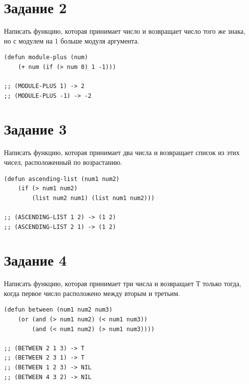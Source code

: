 \documentclass[a4paper,14pt, unknownkeysallowed]{extreport}
\begin{document}
\section{Задание 2}

Написать функцию, которая принимает число и возвращает число того же знака, но с модулем на 1 больше модуля аргумента.

\begin{center}
\captionsetup{justification=raggedright,singlelinecheck=off}
\begin{lstlisting}[label=lst:parallel_processing,caption=Решение задания 2]
(defun module-plus (num)
    (+ num (if (> num 0) 1 -1)))

;; (MODULE-PLUS 1) -> 2
;; (MODULE-PLUS -1) -> -2
\end{lstlisting}
\end{center}

\section{Задание 3}

Написать функцию, которая принимает два числа и возвращает список из этих чисел, расположенный по возрастанию.

\begin{center}
\captionsetup{justification=raggedright,singlelinecheck=off}
\begin{lstlisting}[label=lst:parallel_processing,caption=Решение задания 3]
(defun ascending-list (num1 num2)
    (if (> num1 num2) 
		(list num2 num1) (list num1 num2)))

;; (ASCENDING-LIST 1 2) -> (1 2)
;; (ASCENDING-LIST 2 1) -> (1 2)
\end{lstlisting}
\end{center}

\section{Задание 4}

Написать функцию, которая принимает три числа и возвращает Т только тогда, когда первое число расположено между вторым и третьим.

\begin{center}
\captionsetup{justification=raggedright,singlelinecheck=off}
\begin{lstlisting}[label=lst:parallel_processing,caption=Решение задания 4]
(defun between (num1 num2 num3)
    (or (and (> num1 num2) (< num1 num3))
        (and (< num1 num2) (> num1 num3))))

;; (BETWEEN 2 1 3) -> T
;; (BETWEEN 2 3 1) -> T
;; (BETWEEN 1 2 3) -> NIL
;; (BETWEEN 4 3 2) -> NIL
\end{lstlisting}
\end{center}
\end{document}
